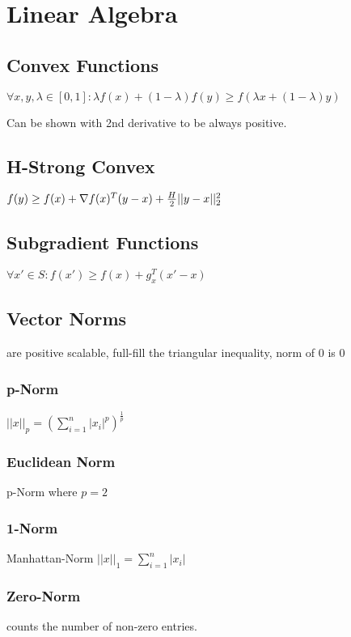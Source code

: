 \documentclass[a4paper,11pt,twocolumn]{article}
\begin{document}
\section{Linear Algebra}

\subsection{Convex Functions}
$\forall x,y, \lambda \in [0,1] : \lambda f(x) + (1-\lambda)f(y) \geq f(\lambda x +  (1-\lambda) y)$

Can be shown with 2nd derivative to be always positive.

\subsection{H-Strong Convex}
$f(y) \geq f(x) + \nabla f(x)^T(y-x) + {H \over 2 } || y - x ||_2^2$

\subsection{Subgradient Functions}
$\forall x' \in S : f(x') \geq f(x) + g_x^T(x'-x)$

\subsection{Vector Norms}
are positive scalable, full-fill the triangular inequality, norm of 0 is 0

\subsubsection{p-Norm}
$ || x ||_p = \left( \sum_{i=1}^{n}{|x_i|^p} \right)^{\frac{1}{p}}$

\subsubsection{Euclidean Norm} 
p-Norm where $p=2$

\subsubsection{1-Norm}
Manhattan-Norm
$ ||x||_1 = \sum_{i=1}^{n}{|x_i|} $

\subsubsection{Zero-Norm} 
counts the number of non-zero entries.
\end{document}

